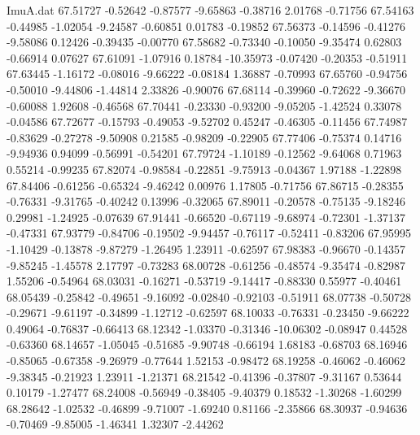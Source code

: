 \begin{filecontents}{ImuA.dat}
  67.51727   -0.52642   -0.87577   -9.65863   -0.38716    2.01768   -0.71756
  67.54163   -0.44985   -1.02054   -9.24587   -0.60851    0.01783   -0.19852
  67.56373   -0.14596   -0.41276   -9.58086    0.12426   -0.39435   -0.00770
  67.58682   -0.73340   -0.10050   -9.35474    0.62803   -0.66914    0.07627
  67.61091   -1.07916    0.18784  -10.35973   -0.07420   -0.20353   -0.51911
  67.63445   -1.16172   -0.08016   -9.66222   -0.08184    1.36887   -0.70993
  67.65760   -0.94756   -0.50010   -9.44806   -1.44814    2.33826   -0.90076
  67.68114   -0.39960   -0.72622   -9.36670   -0.60088    1.92608   -0.46568
  67.70441   -0.23330   -0.93200   -9.05205   -1.42524    0.33078   -0.04586
  67.72677   -0.15793   -0.49053   -9.52702    0.45247   -0.46305   -0.11456
  67.74987   -0.83629   -0.27278   -9.50908    0.21585   -0.98209   -0.22905
  67.77406   -0.75374    0.14716   -9.94936    0.94099   -0.56991   -0.54201
  67.79724   -1.10189   -0.12562   -9.64068    0.71963    0.55214   -0.99235
  67.82074   -0.98584   -0.22851   -9.75913   -0.04367    1.97188   -1.22898
  67.84406   -0.61256   -0.65324   -9.46242    0.00976    1.17805   -0.71756
  67.86715   -0.28355   -0.76331   -9.31765   -0.40242    0.13996   -0.32065
  67.89011   -0.20578   -0.75135   -9.18246    0.29981   -1.24925   -0.07639
  67.91441   -0.66520   -0.67119   -9.68974   -0.72301   -1.37137   -0.47331
  67.93779   -0.84706   -0.19502   -9.94457   -0.76117   -0.52411   -0.83206
  67.95995   -1.10429   -0.13878   -9.87279   -1.26495    1.23911   -0.62597
  67.98383   -0.96670   -0.14357   -9.85245   -1.45578    2.17797   -0.73283
  68.00728   -0.61256   -0.48574   -9.35474   -0.82987    1.55206   -0.54964
  68.03031   -0.16271   -0.53719   -9.14417   -0.88330    0.55977   -0.40461
  68.05439   -0.25842   -0.49651   -9.16092   -0.02840   -0.92103   -0.51911
  68.07738   -0.50728   -0.29671   -9.61197   -0.34899   -1.12712   -0.62597
  68.10033   -0.76331   -0.23450   -9.66222    0.49064   -0.76837   -0.66413
  68.12342   -1.03370   -0.31346  -10.06302   -0.08947    0.44528   -0.63360
  68.14657   -1.05045   -0.51685   -9.90748   -0.66194    1.68183   -0.68703
  68.16946   -0.85065   -0.67358   -9.26979   -0.77644    1.52153   -0.98472
  68.19258   -0.46062   -0.46062   -9.38345   -0.21923    1.23911   -1.21371
  68.21542   -0.41396   -0.37807   -9.31167    0.53644    0.10179   -1.27477
  68.24008   -0.56949   -0.38405   -9.40379    0.18532   -1.30268   -1.60299
  68.28642   -1.02532   -0.46899   -9.71007   -1.69240    0.81166   -2.35866
  68.30937   -0.94636   -0.70469   -9.85005   -1.46341    1.32307   -2.44262

\end{filecontents}
